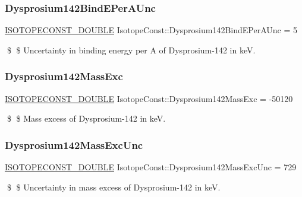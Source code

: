 \subsubsection{\texorpdfstring{Dysprosium142\+Bind\+E\+Per\+A\+Unc}{Dysprosium142BindEPerAUnc}}
{\footnotesize\ttfamily \mbox{\hyperlink{group___isotope_const-_macros_ga8f45a7272ce02c0b4c65c44636ed719a}{I\+S\+O\+T\+O\+P\+E\+C\+O\+N\+S\+T\+\_\+\+D\+O\+U\+B\+LE}} Isotope\+Const\+::\+Dysprosium142\+Bind\+E\+Per\+A\+Unc = 5}

\$ \$ Uncertainty in binding energy per A of Dysprosium-\/142 in keV. \mbox{\label{group___isotope_const-_dysprosium-_dy142_ga03d850d7495bb4a03480792cb7542bfd}} 
\subsubsection{\texorpdfstring{Dysprosium142\+Mass\+Exc}{Dysprosium142MassExc}}
{\footnotesize\ttfamily \mbox{\hyperlink{group___isotope_const-_macros_ga8f45a7272ce02c0b4c65c44636ed719a}{I\+S\+O\+T\+O\+P\+E\+C\+O\+N\+S\+T\+\_\+\+D\+O\+U\+B\+LE}} Isotope\+Const\+::\+Dysprosium142\+Mass\+Exc = -\/50120}

\$ \$ Mass excess of Dysprosium-\/142 in keV. \mbox{\label{group___isotope_const-_dysprosium-_dy142_gaaed5cee300f5274f0c0a5ece97149e76}} 
\subsubsection{\texorpdfstring{Dysprosium142\+Mass\+Exc\+Unc}{Dysprosium142MassExcUnc}}
{\footnotesize\ttfamily \mbox{\hyperlink{group___isotope_const-_macros_ga8f45a7272ce02c0b4c65c44636ed719a}{I\+S\+O\+T\+O\+P\+E\+C\+O\+N\+S\+T\+\_\+\+D\+O\+U\+B\+LE}} Isotope\+Const\+::\+Dysprosium142\+Mass\+Exc\+Unc = 729}

\$ \$ Uncertainty in mass excess of Dysprosium-\/142 in keV. \mbox{\label{group___isotope_const-_dysprosium-_dy142_ga20d0b55a78c397ed527c672c34c6a43c}} 
